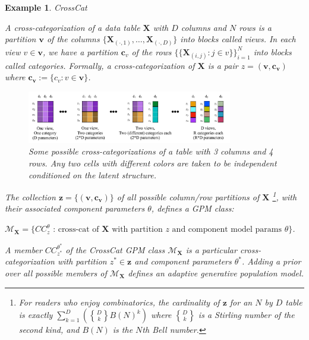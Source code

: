\documentclass[10pt,letterpaper]{article}
\newtheorem{example}{Example}[section]
\newcommand{\set}[1]{\{#1\}}
\begin{document}
\begin{example} \label{ex:crosscat} CrossCat

A cross-categorization of a data table $\mathbf{X}$ with $D$ columns and $N$ 
rows is a partition $\mathbf{v}$ of the columns 
$\set{\mathbf{X}_{(\cdot,1)},\dots,\mathbf{X}_{(\cdot,D)}}$ into blocks 
called \textit{views}.
In each view $v \in \mathbf{v}$, we have a partition $\mathbf{c}_v$ of the rows 
$\set{\set{\mathbf{X}_{(i,j)}:j \in v}}_{i=1}^N$
into blocks called \textit{categories}.
Formally, a cross-categorization of 
$\mathbf{X}$ is a pair $z = (\mathbf{v},\mathbf{c_v})$ where
$\mathbf{c_v} := \set{c_v: v \in \mathbf{v}}$.

\begin{figure}[ht]
    \centering
\includegraphics[width=0.8\textwidth]{cc.jpeg}
\caption{Some possible cross-categorizations of a table with 3 columns
  and 4 rows.  Any two cells with different colors are taken to be
  independent conditioned on the latent structure.}
\label{fig:cc}
\end{figure}
The collection
$\mathbf{z} = \set{(\mathbf{v},\mathbf{c_v})}$ of all possible column/row 
partitions of $\mathbf{X}$
    \footnote{For readers who enjoy combinatorics, the cardinality of 
        $\mathbf{z}$ for an $N$ by $D$ table
        is exactly $\sum_{k=1}^{D}\left({D \brace k}B(N)^k\right)$ 
        where ${D \brace k}$ is a Stirling number of the second kind, and 
        $B(N)$ is the $N$th Bell number.},
with their associated component parameters $\theta$, defines a GPM class:

$\mathcal{M}_\textbf{X} = \set{CC_z^{\theta} \text{ : cross-cat of } \mathbf{X}
\text{ with partition } z \text{ and component model params } \theta}$.

A member $CC_{z^*}^{\theta^*}$ of the CrossCat GPM class 
$\mathcal{M}_\mathbf{X}$ is a particular cross-categorization with partition 
$z^* \in \mathbf{z}$ and component parameters $\theta^*$.  Adding a prior over 
all possible members of $\mathcal{M}_\mathbf{X}$ defines an adaptive generative 
population model.
\end{example}

\end{document}
